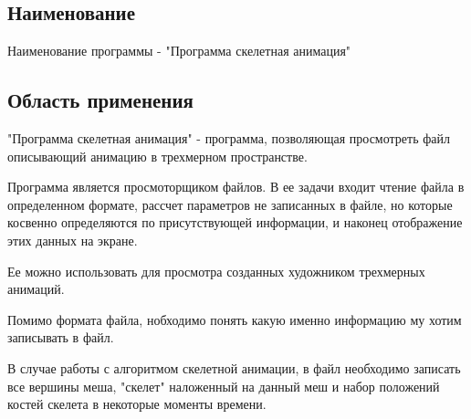 \subsection{Наименование}
Наименование программы - "Программа скелетная анимация"

\subsection{Область применения}
"Программа скелетная анимация" - программа, позволяющая просмотреть файл описывающий анимацию в трехмерном пространстве. 

Программа является просмоторщиком файлов. В ее задачи входит чтение файла в определенном формате, рассчет параметров не записанных  в файле, но которые косвенно определяются по присутствующей информации, и наконец отображение этих данных на экране. 

Ее можно использовать для просмотра созданных художником трехмерных анимаций. 

Помимо формата файла, нобходимо понять какую именно информацию му хотим записывать в файл. 

В случае работы с алгоритмом скелетной анимации, в файл необходимо записать все вершины меша, "скелет" наложенный на данный меш и набор положений костей скелета в некоторые моменты времени.

